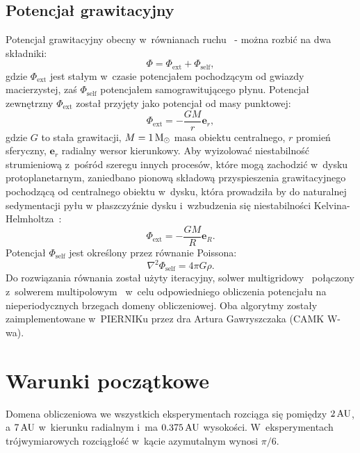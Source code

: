 \subsection{Potencjał grawitacyjny}
Potencjał grawitacyjny obecny w~równianach ruchu~ -  można
rozbić na dwa składniki:
\begin{equation}
   \Phi = \Phi_{\textrm{ext}} + \Phi_{\textrm{self}},
\end{equation}
gdzie $\Phi_{\textrm{ext}}$ jest stałym w~czasie potencjałem pochodzącym od
gwiazdy macierzystej, zaś $\Phi_{\textrm{self}}$ potencjałem samograwitującego
płynu. Potencjał zewnętrzny $\Phi_{\textrm{ext}}$ został przyjęty jako potencjał
od masy punktowej:
\begin{equation}
   \Phi_{\textrm{ext}} = -\frac{GM}{r} \mathbf{e}_r,
\end{equation}
gdzie $G$ to stała grawitacji, $M = 1\hbox{$\mathrm{\thinspace M_{\odot}}$}$ masa obiektu centralnego, $r$
promień sferyczny, $\mathbf{e}_r$ radialny wersor kierunkowy.
Aby wyizolować niestabilność strumieniową z~pośród
szeregu innych procesów, które mogą zachodzić w~dysku protoplanetarnym,
zaniedbano pionową składową przyspieszenia grawitacyjnego pochodzącą od
centralnego obiektu w~dysku, która prowadziła by do naturalnej sedymentacji pyłu
w płaszczyźnie dysku i~wzbudzenia się niestabilności
Kelvina-Helmholtza~\cite{JHK06}:
\begin{equation}\label{eq:phiext}
   \Phi_{\textrm{ext}} = -\frac{GM}{R} \mathbf{e}_R.
\end{equation}
%
Potencjał $\Phi_{\textrm{self}}$ jest określony przez równanie Poissona:
\begin{equation}\label{eq:poisson}
   \nabla^2 \Phi_{\textrm{self}} = 4\pi G \rho.
\end{equation}
Do rozwiązania równania  został użyty iteracyjny, solwer
multigridowy~\citep{HG00} połączony z~solwerem multipolowym~\citep{J77} w~celu
odpowiedniego obliczenia potencjału na nieperiodycznych brzegach domeny
obliczeniowej. Oba algorytmy zostały zaimplementowane w~PIERNIKu przez dra
Artura Gawryszczaka (CAMK W-wa).

\section{Warunki początkowe}
Domena obliczeniowa we wszystkich eksperymentach rozciąga się pomiędzy $2\hbox{$\thinspace\textrm{AU}$}$, a
$7\hbox{$\thinspace\textrm{AU}$}$ w~kierunku radialnym i~ma $0.375\hbox{$\thinspace\textrm{AU}$}$ wysokości. W~eksperymentach
trójwymiarowych rozciągłość w~kącie azymutalnym wynosi $\pi / 6$.

